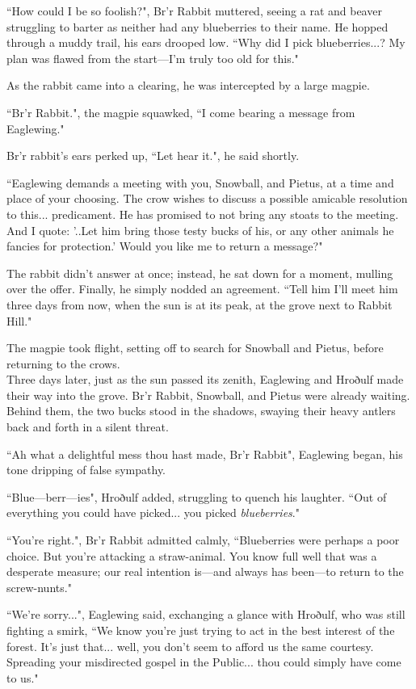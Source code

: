 ``How could I be so foolish?", Br'r Rabbit muttered, seeing a rat and beaver struggling to barter as neither had any blueberries to their name. He hopped through a muddy trail, his ears drooped low. ``Why did I pick blueberries...? My plan was flawed from the start---I'm truly too old for this."

As the rabbit came into a clearing, he was intercepted by a large magpie.

``Br'r Rabbit.", the magpie squawked, ``I come bearing a message from Eaglewing."

Br'r rabbit's ears perked up, ``Let hear it.", he said shortly.

``Eaglewing demands a meeting with you, Snowball, and Pietus, at a time and place of your choosing. The crow wishes to discuss a possible amicable resolution to this... predicament. He has promised to not bring any stoats to the meeting. And I quote: '..Let him bring those testy bucks of his, or any other animals he fancies for protection.' Would you like me to return a message?"

The rabbit didn't answer at once; instead, he sat down for a moment, mulling over the offer. Finally, he simply nodded an agreement. ``Tell him I'll meet him three days from now, when the sun is at its peak, at the grove next to Rabbit Hill."

The magpie took flight, setting off to search for Snowball and Pietus, before returning to the crows.\\

Three days later, just as the sun passed its zenith, Eaglewing and Hroðulf made their way into the grove. Br'r Rabbit, Snowball, and Pietus were already waiting. Behind them, the two bucks stood in the shadows, swaying their heavy antlers back and forth in a silent threat.

``Ah what a delightful mess thou hast made, Br'r Rabbit", Eaglewing began, his tone dripping of false sympathy.

``Blue---berr---ies", Hroðulf added, struggling to quench his laughter. ``Out of everything you could have picked... you picked \textit{blueberries}."

``You're right.", Br'r Rabbit admitted calmly, ``Blueberries were perhaps a poor choice. But you're attacking a straw-animal. You know full well that was a desperate measure; our real intention is---and always has been---to return to the screw-nunts."

``We're sorry...", Eaglewing said, exchanging a glance with Hroðulf, who was still fighting a smirk, ``We know you're just trying to act in the best interest of the forest. It's just that... well, you don't seem to afford us the same courtesy. Spreading your misdirected gospel in the Public... thou could simply have come to us."

